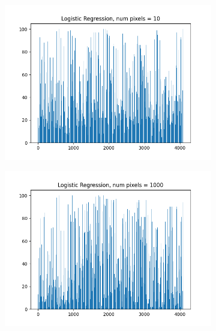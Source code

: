 \documentclass{article}
\begin{document}
\begin{figure}[H]
\begin{subfigure}{.33\textwidth}
  \centering
  \includegraphics[width=1\linewidth]{2e/Logistic Regression, 10.png}  
  
  \label{fig:sub-first}
\end{subfigure}
\begin{subfigure}{.33\textwidth}
  \centering
  \includegraphics[width=1\linewidth]{2e/Logistic Regression, 1000.png}  
  

\end{subfigure}
\end{figure}
\end{document}
